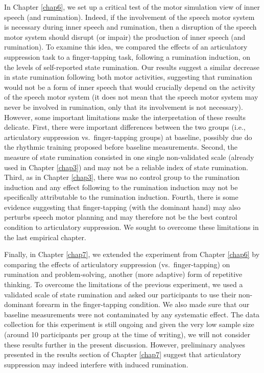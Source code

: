 \documentclass[a4paper,12pt,twoside,openright,oldfontcommands,final]{memoir}
\begin{document}
In Chapter \ref{chap6}, we set up a critical test of the motor simulation view of inner speech (and rumination). Indeed, if the involvement of the speech motor system is necessary during inner speech and rumination, then a disruption of the speech motor system should disrupt (or impair) the production of inner speech (and rumination). To examine this idea, we compared the effects of an articulatory suppression task to a finger-tapping task, following a rumination induction, on the levels of self-reported state rumination. Our results suggest a similar decrease in state rumination following both motor activities, suggesting that rumination would not be a form of inner speech that would crucially depend on the activity of the speech motor system (it does not mean that the speech motor system may never be involved in rumination, only that its involvement is not necessary). However, some important limitations make the interpretation of these results delicate. First, there were important differences between the two groups (i.e., articulatory suppression vs.~finger-tapping groups) at baseline, possibly due do the rhythmic training proposed before baseline measurements. Second, the measure of state rumination consisted in one single non-validated scale (already used in Chapter \ref{chap3}) and may not be a reliable index of state rumination. Third, as in Chapter \ref{chap3}, there was no control group to the rumination induction and any effect following to the rumination induction may not be specifically attributable to the rumination induction. Fourth, there is some evidence suggesting that finger-tapping (with the dominant hand) may also perturbs speech motor planning and may therefore not be the best control condition to articulatory suppression. We sought to overcome these limitations in the last empirical chapter.

Finally, in Chapter \ref{chap7}, we extended the experiment from Chapter \ref{chap6} by comparing the effects of articulatory suppression (vs.~finger-tapping) on rumination and problem-solving, another (more adaptive) form of repetitive thinking. To overcome the limitations of the previous experiment, we used a validated scale of state rumination and asked our participants to use their non-dominant forearm in the finger-tapping condition. We also made sure that our baseline measurements were not contaminated by any systematic effect. The data collection for this experiment is still ongoing and given the very low sample size (around 10 participants per group at the time of writing), we will not consider these results further in the present discussion. However, preliminary analyses presented in the results section of Chapter \ref{chap7} suggest that articulatory suppression may indeed interfere with induced rumination.
\end{document}
